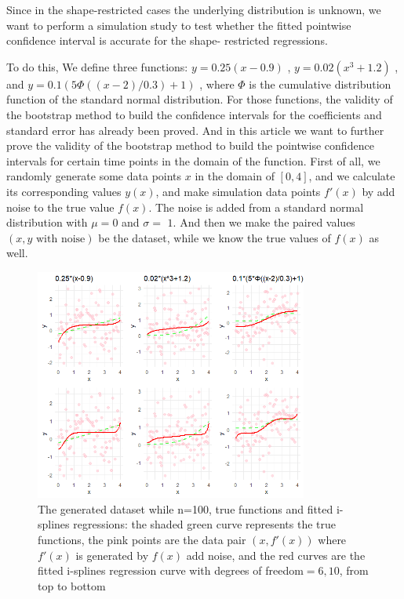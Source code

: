 \documentclass[12pt]{article}
\begin{document}
Since in the shape-restricted cases the underlying distribution is unknown, we want to perform a simulation study to test whether the fitted pointwise confidence interval is accurate for the shape- restricted regressions.

To do this, We define three functions: \(y = 0.25(x - 0.9)\) , \(y = 0.02(x^3+1.2)\) , and \(y = 0.1(5\Phi((x - 2)/0.3) + 1)\) , where \(\Phi\) is the cumulative distribution function of the standard normal distribution. For those functions, the validity of the bootstrap method to build the confidence intervals for the coefficients and standard error has already been proved. \cite{jieying2022heteroscedastic} And in this article we want to further prove the validity of the bootstrap method to build the pointwise confidence intervals for certain time points in the domain of the function. First of all, we randomly generate some data points \(x\) in the domain of \([0,4]\), and we calculate its corresponding values \(y(x)\), and make simulation data points \(f'(x)\) by add noise to the true value \(f(x)\). The noise is added from a standard normal distribution with \(\mu = 0\) and \(\sigma = \) \(1\). And then we make the paired values \((x, y\text{ with noise})\) be the dataset, while we know the true values of \(f(x)\) as well. 


\begin{figure}[H]
  \centering
  \includegraphics[width=0.8\textwidth]{Regression.jpg}
  \caption{The generated dataset while n=100, true functions and fitted i-splines regressions: the shaded green curve represents the true functions, the pink points are the data pair \((x, f'(x))\) where \(f'(x)\) is generated by \(f(x)\) add noise, and the red curves are the fitted i-splines regression curve with degrees of freedom\(= 6, 10\), from top to bottom}
  \label{fig:DataAndRegressions}
\end{figure}
\end{document}
